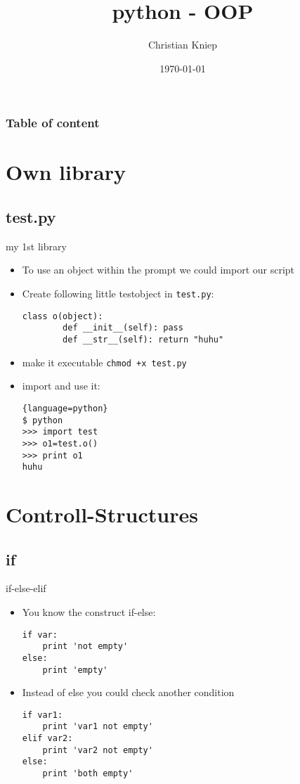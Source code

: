 \documentclass[hyperref={pdfpagelabels=false}]{beamer}
\author{Christian Kniep}
\newcommand{\code}[1]{\colorbox{lGray}{\texttt{#1}}}
\begin{document}
\title{python - OOP}  
\date[\today]{\today} 

\begin{frame}
	\titlepage
\end{frame} 

\begin{frame}
	\frametitle{Table of content}
	\tableofcontents
\end{frame} 

        
\section{Own library}
    \subsection{test.py}
        \begin{frame}[fragile]{my 1st library}
			\begin{itemize}
                \item<1-> To use an object within the prompt we could import our script
                \item<1-> Create following little testobject in \code{test.py}:
                    \begin{lstlisting}
class o(object):
        def __init__(self): pass
        def __str__(self): return "huhu"
\end{lstlisting}
                \item<2-> make it executable \code{chmod +x test.py}
                \item<2-> import and use it:
                \begin{lstlisting}{language=python}
$ python
>>> import test
>>> o1=test.o()
>>> print o1
huhu
\end{lstlisting}
            \end{itemize}
		\end{frame}

\section{Controll-Structures}
    \subsection{if}
        \begin{frame}[fragile]{if-else-elif}
        	\begin{itemize}
                \item<1-> You know the construct if-else:
                    \begin{lstlisting}
if var:
    print 'not empty'
else:
    print 'empty'
\end{lstlisting}
                \item<2-> Instead of else you could check another condition
                    \begin{lstlisting}
if var1:
    print 'var1 not empty'
elif var2:
    print 'var2 not empty'
else:
    print 'both empty'
\end{lstlisting}             
            \end{itemize}
		\end{frame}
\end{document}
